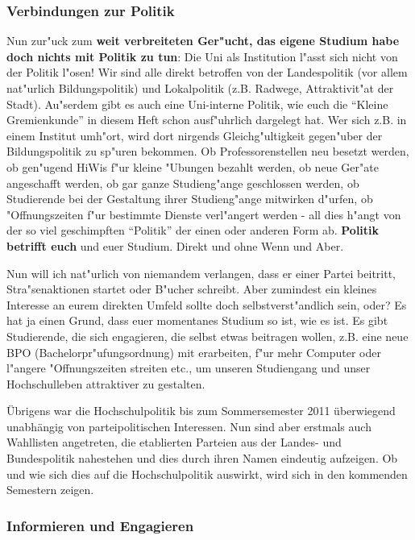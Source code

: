 \subsubsection*{Verbindungen zur Politik}

Nun zur"uck zum \textbf{weit verbreiteten Ger"ucht, das eigene Studium habe 
doch nichts mit Politik zu tun}: Die Uni als Institution l"asst sich nicht von 
der Politik l"osen! Wir sind alle direkt betroffen von der Landespolitik (vor 
allem nat"urlich Bildungspolitik) und Lokalpolitik (z.B. Radwege, 
Attraktivit"at der Stadt). Au"serdem gibt es auch eine Uni-interne Politik, wie 
euch die "`Kleine Gremienkunde"' in diesem Heft schon ausf"uhrlich dargelegt 
hat. Wer sich z.B. in einem Institut umh"ort, wird dort nirgends 
Gleichg"ultigkeit gegen"uber der Bildungspolitik zu sp"uren bekommen. Ob 
Professorenstellen neu besetzt werden, ob gen"ugend HiWis f"ur kleine "Ubungen 
bezahlt werden, ob neue Ger"ate angeschafft werden, ob gar ganze Studieng"ange 
geschlossen werden, ob Studierende bei der Gestaltung ihrer Studieng"ange 
mitwirken d"urfen, ob "Offnungszeiten f"ur bestimmte Dienste verl"angert werden 
- all dies h"angt von der so viel geschimpften "`Politik"' der einen oder 
anderen Form ab. \textbf{Politik betrifft euch} und euer Studium. Direkt und 
ohne Wenn und Aber.

Nun will ich nat"urlich von niemandem verlangen, dass er einer Partei beitritt, 
Stra"senaktionen startet oder B"ucher schreibt. Aber zumindest ein kleines 
Interesse an eurem direkten Umfeld sollte doch selbstverst"andlich sein, oder? 
Es hat ja einen Grund, dass euer momentanes Studium so ist, wie es ist. Es gibt 
Studierende, die sich engagieren, die selbst etwas beitragen wollen, z.B. eine 
neue BPO (Bachelorpr"ufungsordnung) mit erarbeiten, f"ur mehr Computer oder 
l"angere "Offnungszeiten streiten etc., um unseren Studiengang und unser 
Hochschulleben attraktiver zu gestalten.

Übrigens war die Hochschulpolitik bis zum Sommersemester 2011 überwiegend 
unabhängig von parteipolitischen Interessen. Nun sind aber erstmals auch 
Wahllisten angetreten, die etablierten Parteien aus der Landes- und Bundespolitik
nahestehen und dies durch ihren Namen eindeutig aufzeigen. Ob und wie sich dies auf die 
Hochschulpolitik auswirkt, wird sich in den kommenden Semestern zeigen.

\subsubsection*{Informieren und Engagieren}

